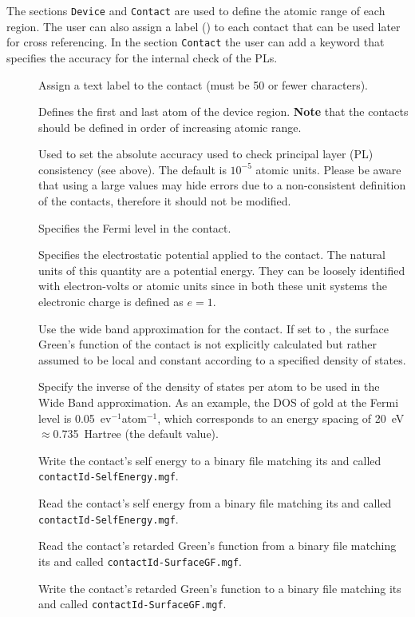 The sections \verb|Device| and \verb|Contact| are used to define the atomic
range of each region. The user can also assign a label () to each contact
that can be used later for cross referencing. In the section \verb|Contact| the
user can add a keyword that specifies the accuracy for the internal check of the
PLs.

\begin{description}
\item[] Assign a text label to the contact (must be 50 or fewer
  characters).
\item[] \label{AtomRange} Defines the first and last atom of the
  device region.  {\bf Note} that the contacts should be defined in order of
  increasing atomic range.
\item[] Used to set the absolute
  accuracy used to check principal layer (PL) consistency (see above). The
  default is $10^{-5}$ atomic units. Please be aware that using a large values
  may hide errors due to a non-consistent definition of the contacts, therefore
  it should not be modified.
\item[] Specifies the Fermi level in the
  contact.
\item[] Specifies the electrostatic
  potential applied to the contact. The natural units of this quantity are a
  potential energy. They can be loosely identified with electron-volts or atomic
  units since in both these unit systems the electronic charge is defined as
  $e=1$.
\item[] Use the wide band approximation for the contact. If set to
  , the surface Green's function of the contact is not explicitly
  calculated but rather assumed to be local and constant according to a
  specified density of states.
\item[] Specify the inverse of the
  density of states per atom to be used in the Wide Band approximation. As an
  example, the DOS of gold at the Fermi level is 0.05~ev$^{-1}$atom$^{-1}$,
  which corresponds to an energy spacing of 20~eV $\approx$0.735~Hartree (the
  default value).
\item[] Write the contact's self energy to a binary file
  matching its  and called \verb|contactId-SelfEnergy.mgf|.
\item[] Read the contact's self energy from a binary file
  matching its  and called \verb|contactId-SelfEnergy.mgf|.
\item[] Read the contact's retarded Green's function from a
  binary file matching its  and called
  \verb|contactId-SurfaceGF.mgf|.
\item[] Write the contact's retarded Green's function to a
  binary file matching its  and called
  \verb|contactId-SurfaceGF.mgf|.
\end{description}

